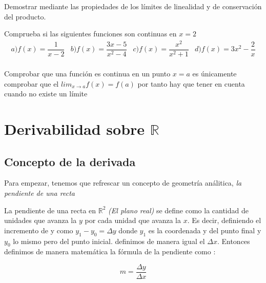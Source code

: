 \begin{ejercicio}
Demostrar mediante las propiedades de los límites de linealidad y de conservación del producto.
\end{ejercicio}

\begin{ejercicio}
Comprueba si las siguientes funciones son continuas en $x=2$
\begin{equation*}
\begin{array}{rrrr}
a) f(x)=\dfrac{1}{x-2}& b)f(x)=\dfrac{3x-5}{x^2-4}& c)f(x)=\dfrac{x^2}{x^2+1}& d)f(x)=3x^2-\dfrac{2}{x}\\
\end{array}
\end{equation*}

Comprobar que una función es continua en un punto $x=a$ es únicamente comprobar que el $\displaystyle lim_{x\to a} f(x)=f(a)$ por tanto hay que tener en cuenta cuando no existe un límite



\end{ejercicio}





\chapter{Derivabilidad sobre $\mathbb{R}$}

\minitoc

\newpage


\section{Concepto de la derivada}
Para empezar, tenemos que refrescar un concepto de geometría análitica, \emph{la pendiente de una recta}
\begin{defi}
La pendiente de una recta en $\mathbb{R}^2$ \emph{(El plano real)} se define como la cantidad de unidades que avanza la $y$ por cada unidad que avanza la $x$. Es decir, definiendo el incremento de y como $y_1-y_0=\Delta y$ donde $y_1$ es la coordenada y del punto final y $y_0$ lo mismo pero del punto inicial. definimos de manera igual el $\Delta x$. Entonces definimos de manera matemática la fórmula de la pendiente como :
\end{defi}
\begin{equation*}
m=\dfrac{\Delta y}{\Delta x}
\end{equation*}

